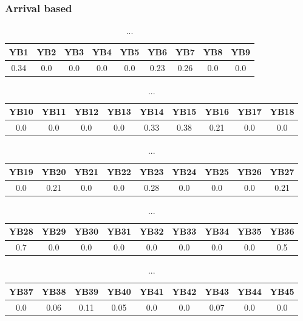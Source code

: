 \documentclass[]{article}
\begin{document}
\subsubsection{Arrival based}
\begin{table}[h]
	\centering
	\begin{tabular}{|c|c|c|c|c|c|c|c|c|}
		\hline
		YB1  & YB2 & YB3 & YB4 & YB5 & YB6  & YB7  & YB8 & YB9 \\
		\hline
		0.34 & 0.0 & 0.0 & 0.0 & 0.0 & 0.23 & 0.26 & 0.0 & 0.0 \\
		\hline
	\end{tabular}
	\caption{...}
\end{table}
\begin{table}[h]
	\centering
	\begin{tabular}{|c|c|c|c|c|c|c|c|c|}
		\hline
		YB10 & YB11 & YB12 & YB13 & YB14 & YB15 & YB16 & YB17 & YB18 \\
		\hline
		0.0  & 0.0  & 0.0  & 0.0  & 0.33 & 0.38 & 0.21 & 0.0  & 0.0  \\
		\hline
	\end{tabular}
	\caption{...}
\end{table}
\begin{table}[h]
	\centering
	\begin{tabular}{|c|c|c|c|c|c|c|c|c|}
		\hline
		YB19 & YB20 & YB21 & YB22 & YB23 & YB24 & YB25 & YB26 & YB27 \\
		\hline
		0.0  & 0.21 & 0.0  & 0.0  & 0.28 & 0.0  & 0.0  & 0.0  & 0.21 \\
		\hline
	\end{tabular}
	\caption{...}
\end{table}
\begin{table}[h]
	\centering
	\begin{tabular}{|c|c|c|c|c|c|c|c|c|}
		\hline
		YB28 & YB29 & YB30 & YB31 & YB32 & YB33 & YB34 & YB35 & YB36 \\
		\hline
		0.7  & 0.0  & 0.0  & 0.0  & 0.0  & 0.0  & 0.0  & 0.0  & 0.5  \\
		\hline
	\end{tabular}
	\caption{...}
\end{table}
\begin{table}[h]
	\centering
	\begin{tabular}{|c|c|c|c|c|c|c|c|c|}
		\hline
		YB37 & YB38 & YB39 & YB40 & YB41 & YB42 & YB43 & YB44 & YB45 \\
		\hline
		0.0  & 0.06 & 0.11 & 0.05 & 0.0  & 0.0  & 0.07 & 0.0  & 0.0  \\
		\hline
	\end{tabular}
	\caption{...}
\end{table}
\end{document}
